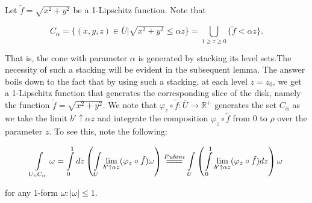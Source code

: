 \documentclass{amsart}
\theoremstyle{named}
\begin{document}
    Let $\tilde{f} = \sqrt{x^2 + y^2}$ be a 1-Lipschitz function. Note that
    
    \begin{equation} \nonumber
        C_{\alpha} = \{ (x,y,z) \in \overline{U} | \sqrt{x^2 + y^2} \leq \alpha z \} = \bigcup\limits_{1 \geq z \geq 0} \{ \tilde{f} < \alpha z \}.
    \end{equation}
    
That is, the cone with parameter $\alpha$ is generated by stacking its level sets.The necessity of such a stacking will be evident in the subsequent lemma. The answer boils down to the fact that by using such a stacking, at each level $z = z_0$, we get a 1-Lipschitz function that generates the corresponding slice of the disk, namely the function $\tilde{f} = \sqrt{x^2 + y^2}$. We note that $\varphi_z \circ \tilde{f} : \overline{U} \xrightarrow{} \mathbb{R}^{+} $ generates the set $C_{\alpha}$ as we take the limit $b' \uparrow \alpha z$ and integrate the composition $\varphi_z \circ \tilde{f}$ from 0 to $\rho$ over the parameter $z$. To see this, note the following:

    \begin{equation} \nonumber 
        \int\limits_{U \llcorner C_{\alpha}} \omega  = \int\limits_{0}^{1} dz \left( \int\limits_{U}\lim\limits_{b' \uparrow \alpha z}(\varphi_z \circ \tilde{f}) \omega \right) \stackrel{Fubini}{=\joinrel=\joinrel=} \int\limits_{U}\left( \int\limits_{0}^{1} \lim\limits_{b' \uparrow \alpha z}(\varphi_z \circ \tilde{f}) dz \right)\omega
    \end{equation}
    
    for any 1-form $\omega: |\omega| \leq 1$. 
    
\end{document}
